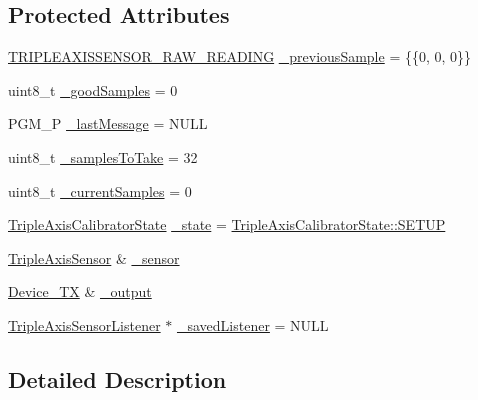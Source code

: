 \subsection*{Protected Attributes}
\begin{DoxyCompactItemize}
\item 
\hyperlink{namespaceflame_ab883ad815041824ba548753dae327bc2}{T\-R\-I\-P\-L\-E\-A\-X\-I\-S\-S\-E\-N\-S\-O\-R\-\_\-\-R\-A\-W\-\_\-\-R\-E\-A\-D\-I\-N\-G} \hyperlink{classflame_1_1_triple_axis_calibrator_a11ec83028a6841ec9d89f61e8f72620e}{\-\_\-previous\-Sample} = \{\{0, 0, 0\}\}
\item 
uint8\-\_\-t \hyperlink{classflame_1_1_triple_axis_calibrator_aa3453c42d8b6f0fdb582d3e722a2db07}{\-\_\-good\-Samples} = 0
\item 
P\-G\-M\-\_\-\-P \hyperlink{classflame_1_1_triple_axis_calibrator_a2d4c8a4a2944e37341d2e3534a329e24}{\-\_\-last\-Message} = N\-U\-L\-L
\item 
uint8\-\_\-t \hyperlink{classflame_1_1_triple_axis_calibrator_a996c1d5e43bd37fba52d8e9ff4b0349c}{\-\_\-samples\-To\-Take} = 32
\item 
uint8\-\_\-t \hyperlink{classflame_1_1_triple_axis_calibrator_a802dbf52302b13c65b7d40dca18742bc}{\-\_\-current\-Samples} = 0
\item 
\hyperlink{namespaceflame_a72abf3b66537683db272a18f7d34a5a7}{Triple\-Axis\-Calibrator\-State} \hyperlink{classflame_1_1_triple_axis_calibrator_a4853069366d07f826e099879724b9083}{\-\_\-state} = \hyperlink{namespaceflame_a72abf3b66537683db272a18f7d34a5a7addbb81a9e3aab6cfa19ad8eb2389efd4}{Triple\-Axis\-Calibrator\-State\-::\-S\-E\-T\-U\-P}
\item 
\hyperlink{classflame_1_1_triple_axis_sensor}{Triple\-Axis\-Sensor} \& \hyperlink{classflame_1_1_triple_axis_calibrator_a4f0dd2bfe0f85a0229fbf74f9944161d}{\-\_\-sensor}
\item 
\hyperlink{classflame_1_1_device___t_x}{Device\-\_\-\-T\-X} \& \hyperlink{classflame_1_1_triple_axis_calibrator_a6fccd0307b71a7dbfa1c4fd0adcaa188}{\-\_\-output}
\item 
\hyperlink{classflame_1_1_triple_axis_sensor_listener}{Triple\-Axis\-Sensor\-Listener} $\ast$ \hyperlink{classflame_1_1_triple_axis_calibrator_ae80be2c28e5243d39b12c33f24ecb595}{\-\_\-saved\-Listener} = N\-U\-L\-L
\end{DoxyCompactItemize}


\subsection{Detailed Description}


